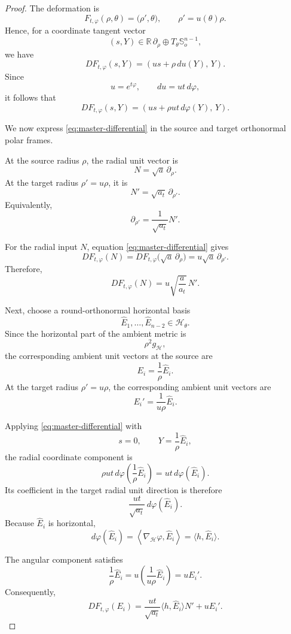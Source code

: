 \documentclass[11pt,reqno]{amsart}
\numberwithin{equation}{section}
\theoremstyle{definition}
\theoremstyle{remark}
\begin{document}
\begin{proof}
The deformation is
\[
F_{t,\varphi}(\rho,\theta)
=
\bigl(\rho',\theta\bigr),
\qquad
\rho'=u(\theta)\rho.
\]
Hence, for a coordinate tangent vector
\[
(s,Y)
\in
\mathbb R\,\partial_\rho
\oplus
T_\theta\mathbb S_o^{n-1},
\]
we have
\[
DF_{t,\varphi}(s,Y)
=
\left(
us+\rho\,du(Y),\,Y
\right).
\]
Since
\[
u=e^{t\varphi},
\qquad
du=ut\,d\varphi,
\]
it follows that
\begin{equation}
DF_{t,\varphi}(s,Y)
=
\left(
us+\rho ut\,d\varphi(Y),\,Y
\right).
\label{eq:master-differential}
\end{equation}

We now express \eqref{eq:master-differential} in the source and
target orthonormal polar frames.

At the source radius $\rho$, the radial unit vector is
\[
N=\sqrt a\,\partial_\rho.
\]
At the target radius $\rho'=u\rho$, it is
\[
N'=\sqrt{a_t}\,\partial_{\rho'}.
\]
Equivalently,
\[
\partial_{\rho'}=\frac{1}{\sqrt{a_t}}N'.
\]

For the radial input $N$, equation
\eqref{eq:master-differential} gives
\[
DF_{t,\varphi}(N)
=
DF_{t,\varphi}\bigl(\sqrt a\,\partial_\rho\bigr)
=
u\sqrt a\,\partial_{\rho'}.
\]
Therefore,
\begin{equation}
DF_{t,\varphi}(N)
=
u\sqrt{\frac{a}{a_t}}\,N'.
\label{eq:DF-radial}
\end{equation}

Next, choose a round-orthonormal horizontal basis
\[
\widehat E_1,\ldots,\widehat E_{n-2}
\in\mathcal H_\theta.
\]
Since the horizontal part of the ambient metric is
\[
\rho^2 g_{\mathcal H},
\]
the corresponding ambient unit vectors at the source are
\[
E_i=\frac{1}{\rho}\widehat E_i.
\]
At the target radius $\rho'=u\rho$, the corresponding ambient unit
vectors are
\[
E_i'=\frac{1}{u\rho}\widehat E_i.
\]

Applying \eqref{eq:master-differential} with
\[
s=0,
\qquad
Y=\frac{1}{\rho}\widehat E_i,
\]
the radial coordinate component is
\[
\rho ut\,
d\varphi\left(\frac{1}{\rho}\widehat E_i\right)
=
ut\,d\varphi(\widehat E_i).
\]
Its coefficient in the target radial unit direction is therefore
\[
\frac{ut}{\sqrt{a_t}}\,
d\varphi(\widehat E_i).
\]
Because $\widehat E_i$ is horizontal,
\[
d\varphi(\widehat E_i)
=
\left\langle
\nabla_{\mathcal H}\varphi,\widehat E_i
\right\rangle
=
\langle h,\widehat E_i\rangle.
\]

The angular component satisfies
\[
\frac{1}{\rho}\widehat E_i
=
u\left(\frac{1}{u\rho}\widehat E_i\right)
=
uE_i'.
\]
Consequently,
\begin{equation}
DF_{t,\varphi}(E_i)
=
\frac{ut}{\sqrt{a_t}}
\langle h,\widehat E_i\rangle N'
+
uE_i'.
\label{eq:DF-horizontal}
\end{equation}


\end{proof}
\end{document}
